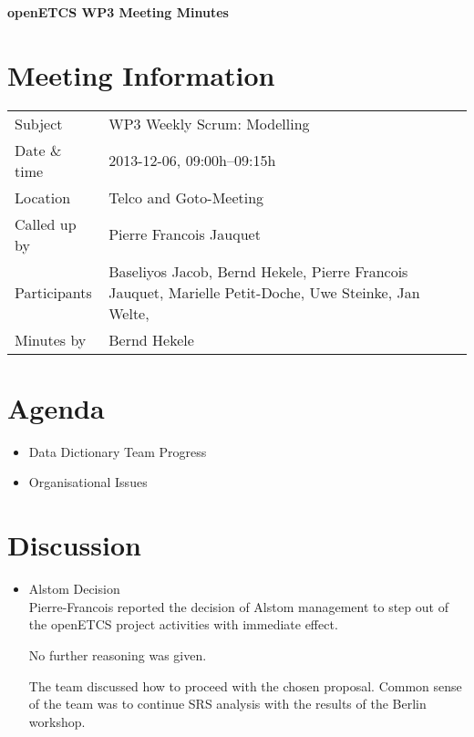 \documentclass[a4paper, 11pt]{article}
\begin{document}
{\begin{center}\huge\bf openETCS WP3 Meeting Minutes\end{center}}
\section{Meeting Information}

\renewcommand{\arraystretch}{1.5}
\begin{supertabular}{m{.2\textwidth}m{.8\textwidth}}
Subject & WP3 Weekly Scrum: Modelling\\
Date \& time & 2013-12-06, 09:00h--09:15h\\
Location & Telco and Goto-Meeting\\
Called up by & Pierre Francois Jauquet\\
Participants &
Baseliyos Jacob,
Bernd Hekele,
Pierre Francois Jauquet,
Marielle Petit-Doche,
Uwe Steinke,
Jan Welte,
\\

Minutes by & Bernd Hekele\\
\end{supertabular}
\renewcommand{\arraystretch}{1.0}


\section{{Agenda}}
\begin{itemize}
\item Data Dictionary Team Progress
\item Organisational Issues 
\end{itemize}

\section{Discussion}
\begin{itemize}
 
\item Alstom Decision\\
Pierre-Francois reported the decision of Alstom management to step out of the openETCS project activities with immediate effect.

No further reasoning was given.

The team discussed how to proceed with the chosen proposal.
Common sense of the team was to continue SRS analysis with the results of the Berlin workshop.

\end{itemize}
\end{document}
